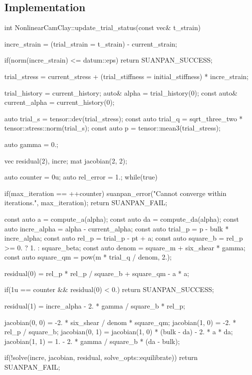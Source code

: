 \subsection{Implementation}
\begin{cppcode}
int NonlinearCamClay::update_trial_status(const vec& t_strain) {
    incre_strain = (trial_strain = t_strain) - current_strain;

    if(norm(incre_strain) <= datum::eps) return SUANPAN_SUCCESS;

    trial_stress = current_stress + (trial_stiffness = initial_stiffness) * incre_strain;

    trial_history = current_history;
    auto& alpha = trial_history(0);
    const auto& current_alpha = current_history(0);

    auto trial_s = tensor::dev(trial_stress);
    const auto trial_q = sqrt_three_two * tensor::stress::norm(trial_s);
    const auto p = tensor::mean3(trial_stress);

    auto gamma = 0.;

    vec residual(2), incre;
    mat jacobian(2, 2);

    auto counter = 0u;
    auto rel_error = 1.;
    while(true) {
        if(max_iteration == ++counter) {
            suanpan_error("Cannot converge within {} iterations.\n", max_iteration);
            return SUANPAN_FAIL;
        }

        const auto a = compute_a(alpha);
        const auto da = compute_da(alpha);
        const auto incre_alpha = alpha - current_alpha;
        const auto trial_p = p - bulk * incre_alpha;
        const auto rel_p = trial_p - pt + a;
        const auto square_b = rel_p >= 0. ? 1. : square_beta;
        const auto denom = square_m + six_shear * gamma;
        const auto square_qm = pow(m * trial_q / denom, 2.);

        residual(0) = rel_p * rel_p / square_b + square_qm - a * a;

        if(1u == counter && residual(0) < 0.) return SUANPAN_SUCCESS;

        residual(1) = incre_alpha - 2. * gamma / square_b * rel_p;

        jacobian(0, 0) = -2. * six_shear / denom * square_qm;
        jacobian(1, 0) = -2. * rel_p / square_b;
        jacobian(0, 1) = jacobian(1, 0) * (bulk - da) - 2. * a * da;
        jacobian(1, 1) = 1. - 2. * gamma / square_b * (da - bulk);

        if(!solve(incre, jacobian, residual, solve_opts::equilibrate)) return SUANPAN_FAIL;

}}
\end{cppcode}
